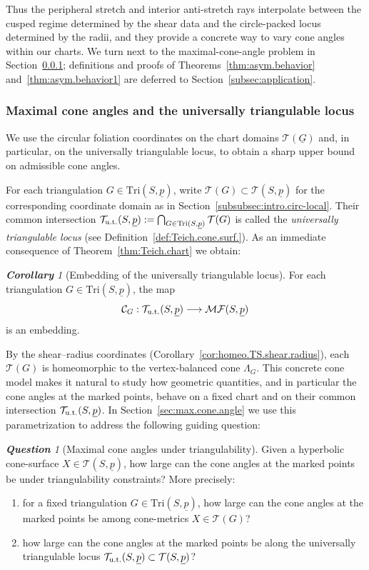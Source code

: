 \documentclass[11pt, letterpaper]{amsart}
\theoremstyle{definition}
\theoremstyle{remark}
\newtheorem{corollary}[theorem]{\rm\bf Corollary}
\newtheorem{question}[theorem]{\rm\bf Question}
\newcommand{\up}{\underline{p}}
\newcommand{\Sp}{(S,\up)}
\newcommand{\TSp}{\text{Tri}\Sp}
\newcommand{\cMFp}{\mathcal{MF} (S,\up)}
\newcommand{\cCG}{\mathcal{C}_{G}}
\newcommand{\cT}{\mathcal{T}}
\newcommand{\cTp}{\mathcal{T} (S,\up)}
\numberwithin{equation}{section}
\begin{document}
Thus the peripheral stretch and interior anti-stretch rays interpolate between the cusped regime determined by the shear data and the circle-packed locus determined by the radii, and they provide a concrete way to vary cone angles within our charts.
We turn next to the maximal-cone-angle problem in Section~\ref{subsubsec:intro.max-angle}; definitions and proofs of Theorems~\ref{thm:asym.behavior} and~\ref{thm:asym.behavior1} are deferred to Section~\ref{subsec:application}. \subsubsection{Maximal cone angles and the universally triangulable locus}
\label{subsubsec:intro.max-angle}

We use the circular foliation coordinates on the chart domains \(\cT(\underline G)\) and, in particular, on the universally triangulable locus, to obtain a sharp upper bound on admissible cone angles.

For each triangulation \(G \in \TSp\), write \(\cT(G) \subset \cTp\) for the corresponding coordinate domain as in Section~\ref{subsubsec:intro.circ-local}.
Their common intersection \(\cT_{\rm u.t.}(S,\up) := \bigcap_{G \in \TSp} \cT(G)\) is called the \emph{universally triangulable locus} (see Definition~\ref{def:Teich.cone.surf.}).
As an immediate consequence of Theorem~\ref{thm:Teich.chart} we obtain:

\begin{corollary}[Embedding of the universally triangulable locus]\label{cor:embed}
For each triangulation \(G \in \TSp\), the map
\[
  \cCG : \cT_{\rm u.t.}\Sp \longrightarrow \cMFp
\]
is an embedding.
\end{corollary}

By the shear--radius coordinates (Corollary~\ref{cor:homeo.TS.shear.radius}), 
each $\cT(G)$ is homeomorphic to the vertex-balanced cone $\Lambda_G$.
This concrete cone model makes it natural to study how geometric quantities, and in particular the cone angles at the marked points, behave on a fixed chart and on their common intersection $\cT_{\rm u.t.}(S,\underline{p})$.
In Section~\ref{sec:max.cone.angle} we use this parametrization to address the following guiding question:

\begin{question}[Maximal cone angles under triangulability]
\label{q:maximal.angle}
Given a hyperbolic cone-surface \(X\in\cTp\), how large can the cone
angles at the marked points be under triangulability constraints?
More precisely:
\begin{enumerate}
  \item[(a)] for a fixed triangulation \(G\in\TSp\), how large can the cone angles at the marked points be among cone-metrics \(X\in\cT(G)\)?
  \item[(b)] how large can the cone angles at the marked points be along the
  universally triangulable locus \(\cT_{\rm u.t.}(S,\up)\subset\cTp\)?
\end{enumerate}
\end{question}
\end{document}

